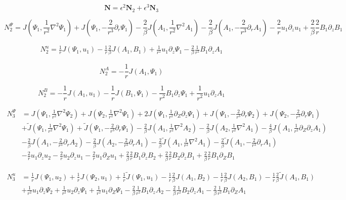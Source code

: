 \documentclass{emulateapj}
\newcommand{\beq}{\begin{equation}}
\newcommand{\eeq}{\end{equation}}
\begin{document}
\beq
\mathbf{N} = \epsilon^2 \mathbf{N}_2 + \epsilon^3 \mathbf{N}_3
\eeq

\beq
N_2^{\Psi}  = J(\Psi_1, \frac{1}{r^2} \nabla^2 \Psi_1) + J(\Psi_1, -\frac{2}{r^3}\partial_r\Psi_1)
- \frac{2}{\beta} J (A_1, \frac{1}{r^2} \nabla^2 A_1) - \frac{2}{\beta} J(A_1, -\frac{2}{r^3} \partial_r A_1) - \frac{2}{r} u_1 \partial_z u_1 + \frac{2}{\beta} \frac{2}{r} B_1 \partial_z B_1
\eeq

\beq
\begin{split}
N_2^{u} = \frac{1}{r} J\left(\Psi_1, u_1\right) - \frac{1}{r} \frac{2}{\beta} J\left(A_1, B_1\right) + \frac{1}{r^2} u_1 \partial_z \Psi_1 - \frac{2}{\beta}\frac{1}{r^2} B_1 \partial_z A_1
\end{split}
\eeq

\beq
N_2^A = -\frac{1}{r} J\left(A_1, \Psi_1\right)
\eeq

\beq
N_2^B = -\frac{1}{r} J\left(A_1, u_1\right) - \frac{1}{r} J\left(B_1, \Psi_1\right) - \frac{1}{r^2} B_1 \partial_z \Psi_1 + \frac{1}{r^2} u_1 \partial_z A_1
\eeq

\beq
\begin{split}
N_3^{\Psi} & = J(\Psi_1, \frac{1}{r^2} \nabla^2 \Psi_2) + J(\Psi_2, \frac{1}{r^2} \nabla^2\Psi_1) + 2 J (\Psi_1, \frac{1}{r^2}\partial_Z\partial_z \Psi_1) + J(\Psi_1, -\frac{2}{r^3}\partial_r \Psi_2) + J(\Psi_2, -\frac{2}{r^3}\partial_r \Psi_1) \\
& + \widetilde{J}(\Psi_1, \frac{1}{r^2} \nabla^2 \Psi_1) + \widetilde{J} (\Psi_1, -\frac{2}{r^3}\partial_r \Psi_1) - \frac{2}{\beta} J(A_1, \frac{1}{r^2}\nabla^2 A_2) - \frac{2}{\beta} J(A_2, \frac{1}{r^2}\nabla^2 A_1) - \frac{4}{\beta} J(A_1, \frac{1}{r^2}\partial_Z\partial_z A_1) \\ & - \frac{2}{\beta} J(A_1, -\frac{2}{r^3} \partial_r A_2 ) 
 - \frac{2}{\beta} J(A_2, -\frac{2}{r^3} \partial_r A_1) - \frac{2}{\beta} \widetilde{J} (A_1, \frac{1}{r^2} \nabla^2 A_1) - \frac{2}{\beta} \widetilde{J} (A_1, -\frac{2}{r^3} \partial_r A_1) \\
& - \frac{2}{r} u_1 \partial_z u_2 - \frac{2}{r} u_2 \partial_z u_1 - \frac{2}{r} u_1 \partial_Z u_1 + \frac{2}{\beta}\frac{2}{r} B_1\partial_z B_2 + \frac{2}{\beta}\frac{2}{r} B_2 \partial_z B_1 + \frac{2}{\beta} \frac{2}{r} B_1 \partial_Z B_1
\end{split}
\eeq

\beq
\begin{split}
N_3^u & = \frac{1}{r}J\left(\Psi_1, u_2\right) + \frac{1}{r}J\left(\Psi_2, u_1\right) + \frac{1}{r}\widetilde{J} \left(\Psi_1, u_1\right) - \frac{1}{r}\frac{2}{\beta} J\left(A_1, B_2\right) - \frac{1}{r} \frac{2}{\beta} J\left(A_2, B_1\right) - \frac{1}{r}\frac{2}{\beta}\widetilde{J}\left(A_1, B_1\right) \\
& + \frac{1}{r^2} u_1\partial_z \Psi_2 + \frac{1}{r^2} u_2 \partial_z \Psi_1 + \frac{1}{r^2} u_1 \partial_Z \Psi_1 - \frac{2}{\beta} \frac{1}{r^2} B_1 \partial_z A_2 - \frac{2}{\beta} \frac{1}{r^2} B_2 \partial_z A_1 - \frac{2}{\beta} \frac{1}{r^2} B_1 \partial_Z A_1
\end{split}
\eeq
\end{document}
